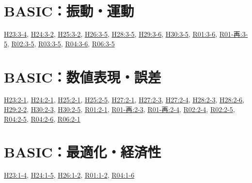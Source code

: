 \section{BASIC：振動・運動}
\hyperref[q:h23-reg-basic-3-4]{H23:3-4}, \hyperref[q:h24-reg-basic-3-2]{H24:3-2}, \hyperref[q:h25-reg-basic-3-2]{H25:3-2}, \hyperref[q:h26-reg-basic-3-5]{H26:3-5}, \hyperref[q:h28-reg-basic-3-5]{H28:3-5}, \hyperref[q:h29-reg-basic-3-6]{H29:3-6}, \hyperref[q:h30-reg-basic-3-5]{H30:3-5}, \hyperref[q:r01-reg-basic-3-6]{R01:3-6}, \hyperref[q:r01-ret-basic-3-5]{R01-再:3-5}, \hyperref[q:r02-reg-basic-3-5]{R02:3-5}, \hyperref[q:r03-reg-basic-3-5]{R03:3-5}, \hyperref[q:r04-reg-basic-3-6]{R04:3-6}, \hyperref[q:r06-reg-basic-3-5]{R06:3-5}
\section{BASIC：数値表現・誤差}
\hyperref[q:h23-reg-basic-2-1]{H23:2-1}, \hyperref[q:h24-reg-basic-2-1]{H24:2-1}, \hyperref[q:h25-reg-basic-2-1]{H25:2-1}, \hyperref[q:h25-reg-basic-2-5]{H25:2-5}, \hyperref[q:h27-reg-basic-2-1]{H27:2-1}, \hyperref[q:h27-reg-basic-2-3]{H27:2-3}, \hyperref[q:h27-reg-basic-2-4]{H27:2-4}, \hyperref[q:h28-reg-basic-2-3]{H28:2-3}, \hyperref[q:h28-reg-basic-2-6]{H28:2-6}, \hyperref[q:h29-reg-basic-2-2]{H29:2-2}, \hyperref[q:h30-reg-basic-2-3]{H30:2-3}, \hyperref[q:h30-reg-basic-2-5]{H30:2-5}, \hyperref[q:r01-reg-basic-2-1]{R01:2-1}, \hyperref[q:r01-ret-basic-2-3]{R01-再:2-3}, \hyperref[q:r01-ret-basic-2-4]{R01-再:2-4}, \hyperref[q:r02-reg-basic-2-4]{R02:2-4}, \hyperref[q:r02-reg-basic-2-5]{R02:2-5}, \hyperref[q:r04-reg-basic-2-5]{R04:2-5}, \hyperref[q:r04-reg-basic-2-6]{R04:2-6}, \hyperref[q:r06-reg-basic-2-1]{R06:2-1}
\section{BASIC：最適化・経済性}
\hyperref[q:h23-reg-basic-1-4]{H23:1-4}, \hyperref[q:h24-reg-basic-1-5]{H24:1-5}, \hyperref[q:h26-reg-basic-1-2]{H26:1-2}, \hyperref[q:r01-reg-basic-1-2]{R01:1-2}, \hyperref[q:r04-reg-basic-1-6]{R04:1-6}
